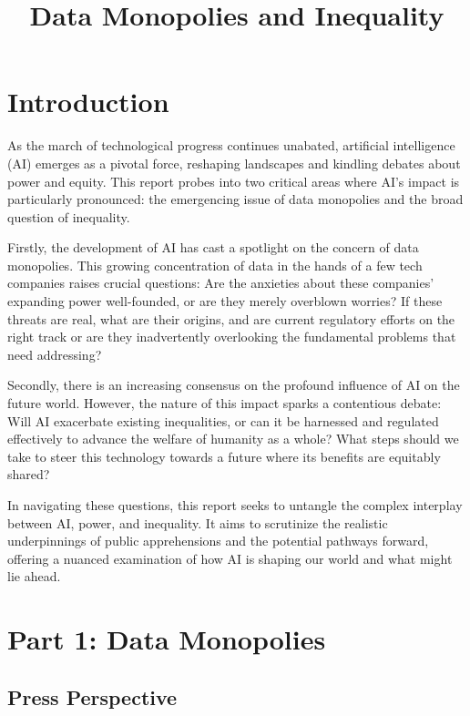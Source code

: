 \documentclass[11pt]{article}
\title{Data Monopolies and Inequality}
\begin{document}
\maketitle

\section{Introduction}

As the march of technological progress continues unabated, artificial intelligence (AI) emerges as a pivotal force, reshaping landscapes and kindling debates about power and equity. This report probes into two critical areas where AI's impact is particularly pronounced: the emergencing issue of data monopolies and the broad question of inequality.

Firstly, the development of AI has cast a spotlight on the concern of data monopolies. This growing concentration of data in the hands of a few tech companies raises crucial questions: Are the anxieties about these companies' expanding power well-founded, or are they merely overblown worries? If these threats are real, what are their origins, and are current regulatory efforts on the right track or are they inadvertently overlooking the fundamental problems that need addressing?

Secondly, there is an increasing consensus on the profound influence of AI on the future world. However, the nature of this impact sparks a contentious debate: Will AI exacerbate existing inequalities, or can it be harnessed and regulated effectively to advance the welfare of humanity as a whole? What steps should we take to steer this technology towards a future where its benefits are equitably shared?

In navigating these questions, this report seeks to untangle the complex interplay between AI, power, and inequality. It aims to scrutinize the realistic underpinnings of public apprehensions and the potential pathways forward, offering a nuanced examination of how AI is shaping our world and what might lie ahead.

\section{Part 1: Data Monopolies}


\subsection{Press Perspective}
\end{document}
